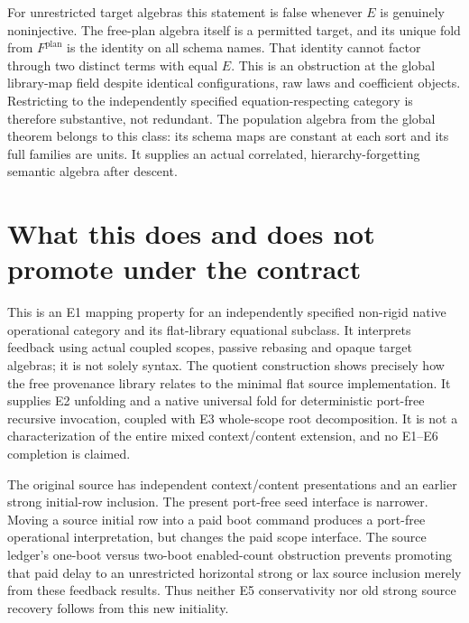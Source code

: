 \documentclass[11pt]{article}
\begin{document}
For unrestricted target algebras this statement is false whenever $E$ is genuinely noninjective. The free-plan algebra itself is a permitted target, and its unique fold from $F^{\mathrm{plan}}$ is the identity on all schema names. That identity cannot factor through two distinct terms with equal $E$. This is an obstruction at the global library-map field despite identical configurations, raw laws and coefficient objects. Restricting to the independently specified equation-respecting category is therefore substantive, not redundant. The population algebra from the global theorem belongs to this class: its schema maps are constant at each sort and its full families are units. It supplies an actual correlated, hierarchy-forgetting semantic algebra after descent.

\section{What this does and does not promote under the contract}
This is an E1 mapping property for an independently specified non-rigid native operational category and its flat-library equational subclass. It interprets feedback using actual coupled scopes, passive rebasing and opaque target algebras; it is not solely syntax. The quotient construction shows precisely how the free provenance library relates to the minimal flat source implementation. It supplies E2 unfolding and a native universal fold for deterministic port-free recursive invocation, coupled with E3 whole-scope root decomposition. It is not a characterization of the entire mixed context/content extension, and no E1--E6 completion is claimed.

The original source has independent context/content presentations and an earlier strong initial-row inclusion. The present port-free seed interface is narrower. Moving a source initial row into a paid boot command produces a port-free operational interpretation, but changes the paid scope interface. The source ledger's one-boot versus two-boot enabled-count obstruction prevents promoting that paid delay to an unrestricted horizontal strong or lax source inclusion merely from these feedback results. Thus neither E5 conservativity nor old strong source recovery follows from this new initiality.
\end{document}
